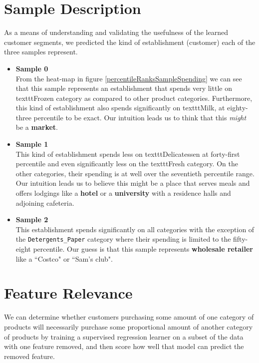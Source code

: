\documentclass[twoside,openright,titlepage,numbers=noenddot,headinclude,%
               footinclude=true,cleardoublepage=empty,abstractoff,BCOR=5mm,%
               paper=a4,fontsize=11pt,ngerman,american]{scrreprt}
\numberwithin{theorem}{chapter}
\numberwithin{definition}{chapter}
\numberwithin{algorithm}{chapter}
\numberwithin{figure}{chapter}
\numberwithin{table}{chapter}
\numberwithin{equation}{chapter}
\begin{document}
\section*{Sample Description}
\label{sampleDescription}

As a means of understanding and validating the usefulness of the learned customer segments, we predicted the kind of establishment (customer) each of the three samples represent.

\begin{itemize}
\item \textbf{Sample 0} \\
From the heat-map in figure \ref{percentileRanksSampleSpending} we can see that this sample represents an establishment that spends very little on texttt{Frozen} category as compared to other product categories. Furthermore, this kind of establishment also spends significantly on texttt{Milk}, at eighty-three percentile to be exact. Our intuition leads us to think that this \emph{might} be a \textbf{market}. 

\item \textbf{Sample 1} \\ 
This kind of establishment spends less on texttt{Delicatessen} at forty-first percentile and even significantly less on the texttt{Fresh} category. On the other categories, their spending is at well over the seventieth percentile range. Our intuition leads us to believe this might be a place that serves meals and offers lodgings like a \textbf{hotel} or a \textbf{university} with a residence halls and adjoining cafeteria. 

\item \textbf{Sample 2} \\
This establishment spends significantly on all categories with the exception of the \texttt{Detergents\_Paper} category where their spending is limited to the fifty-eight percentile. Our guess is that this sample represents \textbf{wholesale retailer} like a ``Costco" or ``Sam's club".

\end{itemize}



\section*{Feature Relevance}
We can determine whether customers purchasing some amount of one category of products will necessarily purchase some proportional amount of another category of products by training a supervised regression learner on a subset of the data with one feature removed, and then score how well that model can predict the removed feature.
\end{document}
